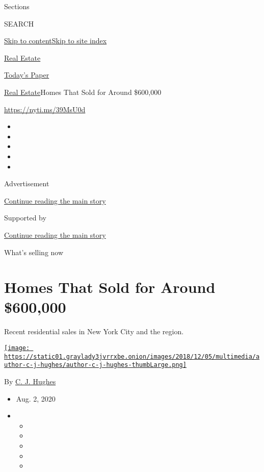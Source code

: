 Sections

SEARCH

\protect\hyperlink{site-content}{Skip to
content}\protect\hyperlink{site-index}{Skip to site index}

\href{https://www.nytimes3xbfgragh.onion/section/realestate}{Real
Estate}

\href{https://myaccount.nytimes3xbfgragh.onion/auth/login?response_type=cookie\&client_id=vi}{}

\href{https://www.nytimes3xbfgragh.onion/section/todayspaper}{Today's
Paper}

\href{/section/realestate}{Real Estate}\textbar{}Homes That Sold for
Around \$600,000

\url{https://nyti.ms/39MsU0d}

\begin{itemize}
\item
\item
\item
\item
\item
\end{itemize}

Advertisement

\protect\hyperlink{after-top}{Continue reading the main story}

Supported by

\protect\hyperlink{after-sponsor}{Continue reading the main story}

What's selling now

\hypertarget{homes-that-sold-for-around-600000}{%
\section{Homes That Sold for Around
\$600,000}\label{homes-that-sold-for-around-600000}}

Recent residential sales in New York City and the region.

\href{https://www.nytimes3xbfgragh.onion/by/c-j-hughes}{\texttt{[image: https://static01.graylady3jvrrxbe.onion/images/2018/12/05/multimedia/author-c-j-hughes/author-c-j-hughes-thumbLarge.png]}}

By \href{https://www.nytimes3xbfgragh.onion/by/c-j-hughes}{C. J. Hughes}

\begin{itemize}
\item
  Aug. 2, 2020
\item
  \begin{itemize}
  \item
  \item
  \item
  \item
  \item
  \end{itemize}
\end{itemize}

